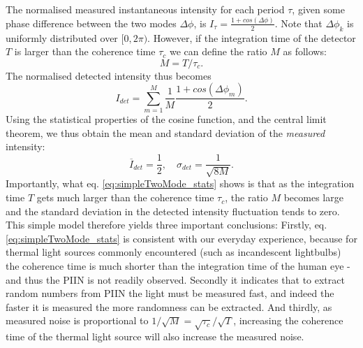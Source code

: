 \documentclass[]{article}
\newcommand*\mean[1]{\overline{#1}}
\begin{document}
	The normalised measured instantaneous intensity for each period $\tau$, given some phase difference between the two modes $\Delta \phi$, is $I_{\tau} = \frac{1+cos(\Delta \phi)}{2}$. Note that $\Delta \phi_k$ is uniformly distributed over $[0,2\pi)$. However, if the integration time of the detector $T$ is larger than the coherence time $\tau_c$ we can define the ratio $M$ as follows:
		\begin{equation}
		M = T/\tau_c.
		\end{equation}
	The normalised detected intensity thus becomes
		\begin{equation}
		I_{det} = \sum_{m=1}^M \frac{1}{M} \frac{1+cos(\Delta \phi_m)}{2}.
		\end{equation}
	Using the statistical properties of the cosine function, and the central limit theorem, we thus obtain the mean and standard deviation of the \textit{measured} intensity:
		\begin{equation}
		\mean{I}_{det} = \frac{1}{2}, \quad \sigma_{det} = \frac{1}{\sqrt{8M}} \label{eq:simpleTwoMode_stats}.
		\end{equation}
	Importantly, what eq. \ref{eq:simpleTwoMode_stats} shows is that as the integration time $T$ gets much larger than the coherence time $\tau_c$, the ratio $M$ becomes large and the standard deviation in the detected intensity fluctuation tends to zero. This simple model therefore yields three important conclusions: Firstly, eq. \ref{eq:simpleTwoMode_stats} is consistent with our everyday experience, because for thermal light sources commonly encountered (such as incandescent lightbulbs) the coherence time is much shorter than the integration time of the human eye - and thus the PIIN is not readily observed. Secondly it indicates that to extract random numbers from PIIN the light must be measured fast, and indeed the faster it is measured the more randomness can be extracted. And thirdly, as measured noise is proportional to $1/\sqrt{M} = \sqrt{\tau_c}/\sqrt{T}$, increasing the coherence time of the thermal light source will also increase the measured noise.
	
\end{document}
